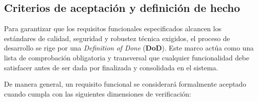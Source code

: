 \subsection{Criterios de aceptación y definición de hecho}\label{sub:criterios_de_aceptacion}

Para garantizar que los requisitos funcionales especificados alcancen los estándares de calidad, seguridad y robustez técnica exigidos, el proceso de desarrollo se rige por una \textit{Definition of Done} (\textbf{DoD}). Este marco actúa como una lista de comprobación obligatoria y transversal que cualquier funcionalidad debe satisfacer antes de ser dada por finalizada y consolidada en el sistema.

De manera general, un requisito funcional se considerará formalmente aceptado cuando cumpla con las siguientes dimensiones de verificación:


